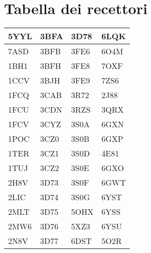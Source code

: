\chapter{Tabella dei recettori}

    \begin{table}[H]
    \begin{tabular}{|l|l|l|l|}
    \hline
        5YYL & 3BFA & 3D78 & 6LQK \\ \hline
        7ASD & 3BFB & 3FE6 & 6O4M \\ \hline
        1BH1 & 3BFH & 3FE8 & 7OXF \\ \hline
        1CCV & 3BJH & 3FE9 & 7ZS6 \\ \hline
        1FCQ & 3CAB & 3R72 & 2J88 \\ \hline
        1FCU & 3CDN & 3RZS & 3QRX \\ \hline
        1FCV & 3CYZ & 3S0A & 6GXN \\ \hline
        1POC & 3CZ0 & 3S0B & 6GXP \\ \hline
        1TER & 3CZ1 & 3S0D & 4E81 \\ \hline
        1TUJ & 3CZ2 & 3S0E & 6GXO \\ \hline
        2H8V & 3D73 & 3S0F & 6GWT \\ \hline
        2LIC & 3D74 & 3S0G & 6YST \\ \hline
        2MLT & 3D75 & 5OHX & 6YSS \\ \hline
        2MW6 & 3D76 & 5XZ3 & 6YSU \\ \hline
        2N8V & 3D77 & 6DST & 5O2R \\ \hline
    \end{tabular}
\end{table}